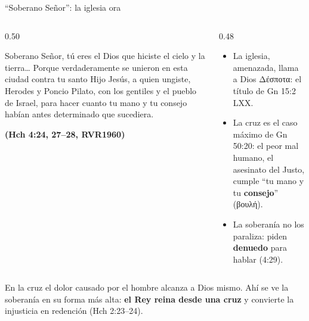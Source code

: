 \documentclass[hyperref={bookmarks=false},aspectratio=169]{beamer}
\newcommand{\grc}[1]{\foreignlanguage{ancientgreek}{#1}}
\newcommand{\fuente}[1]{\par\hfill{\upshape\bfseries\footnotesize\textcolor{azul}{#1}}}
\newcommand{\destacar}[1]{\textbf{\textcolor{azul}{#1}}}
\begin{document}
\begin{frame}{``Soberano Señor'': la iglesia ora}
\begin{columns}[t,onlytextwidth]
\begin{column}{0.50\textwidth}
\begin{cita}Soberano Señor, tú eres el Dios que hiciste el cielo y la tierra\ldots{} Porque verdaderamente se unieron en esta ciudad contra tu santo Hijo Jesús, a quien ungiste, Herodes y Poncio Pilato, con los gentiles y el pueblo de Israel, para hacer cuanto tu mano y tu consejo habían antes determinado que sucediera.\fuente{(Hch 4:24, 27--28, RVR1960)}\end{cita}
\end{column}
\begin{column}{0.48\textwidth}\small
\begin{itemize}
\item La iglesia, amenazada, llama a Dios \grc{Δέσποτα}: el título de Gn 15:2 LXX.
\item La cruz es el caso máximo de Gn 50:20: el peor mal humano, el asesinato del Justo, cumple ``tu mano y tu \destacar{consejo}'' (\grc{βουλή}).
\item La soberanía no los paraliza: piden \destacar{denuedo} para hablar (4:29).
\end{itemize}
\end{column}
\end{columns}\par\smallskip
\begin{tcolorbox}[colback=papiro,colframe=dorado,boxrule=1.2pt,arc=3pt]
\small En la cruz el dolor causado por el hombre alcanza a Dios mismo. Ahí se ve la soberanía en su forma más alta: \destacar{el Rey reina desde una cruz} y convierte la injusticia en redención (Hch 2:23--24).
\end{tcolorbox}
\end{frame}
\end{document}
